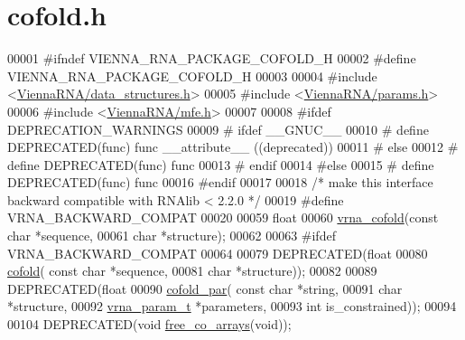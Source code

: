 \hypertarget{cofold_8h_source}{}\section{cofold.\+h}
\label{cofold_8h_source}

\begin{DoxyCode}
00001 \textcolor{preprocessor}{#ifndef VIENNA\_RNA\_PACKAGE\_COFOLD\_H}
00002 \textcolor{preprocessor}{#define VIENNA\_RNA\_PACKAGE\_COFOLD\_H}
00003 
00004 \textcolor{preprocessor}{#include <\hyperlink{data__structures_8h}{ViennaRNA/data\_structures.h}>}
00005 \textcolor{preprocessor}{#include <\hyperlink{params_8h}{ViennaRNA/params.h}>}
00006 \textcolor{preprocessor}{#include <\hyperlink{mfe_8h}{ViennaRNA/mfe.h}>}
00007 
00008 \textcolor{preprocessor}{#ifdef DEPRECATION\_WARNINGS}
00009 \textcolor{preprocessor}{# ifdef \_\_GNUC\_\_}
00010 \textcolor{preprocessor}{#  define DEPRECATED(func) func \_\_attribute\_\_ ((deprecated))}
00011 \textcolor{preprocessor}{# else}
00012 \textcolor{preprocessor}{#  define DEPRECATED(func) func}
00013 \textcolor{preprocessor}{# endif}
00014 \textcolor{preprocessor}{#else}
00015 \textcolor{preprocessor}{# define DEPRECATED(func) func}
00016 \textcolor{preprocessor}{#endif}
00017 
00018 \textcolor{comment}{/* make this interface backward compatible with RNAlib < 2.2.0 */}
00019 \textcolor{preprocessor}{#define VRNA\_BACKWARD\_COMPAT}
00020 
00059 \textcolor{keywordtype}{float}
00060 \hyperlink{group__mfe__cofold_ga9ef3a297201dbf838a8daff2b45c0c82}{vrna\_cofold}(\textcolor{keyword}{const} \textcolor{keywordtype}{char} *sequence,
00061             \textcolor{keywordtype}{char} *structure);
00062 
00063 \textcolor{preprocessor}{#ifdef VRNA\_BACKWARD\_COMPAT}
00064 
00079 DEPRECATED(\textcolor{keywordtype}{float}
00080 \hyperlink{group__mfe__cofold_gabc8517f22cfe70595ee81fc837910d52}{cofold}( \textcolor{keyword}{const} \textcolor{keywordtype}{char} *sequence,
00081         \textcolor{keywordtype}{char} *structure));
00082 
00089 DEPRECATED(\textcolor{keywordtype}{float}
00090 \hyperlink{group__mfe__cofold_ga7612cfeeb1b793f1e4179b1eb53df1f3}{cofold\_par}( \textcolor{keyword}{const} \textcolor{keywordtype}{char} *\textcolor{keywordtype}{string},
00091             \textcolor{keywordtype}{char} *structure,
00092             \hyperlink{group__energy__parameters_structvrna__param__s}{vrna\_param\_t} *parameters,
00093             \textcolor{keywordtype}{int} is\_constrained));
00094 
00104 DEPRECATED(\textcolor{keywordtype}{void} \hyperlink{group__mfe__cofold_gaafb33d7473eb9af9d1b168ca8761c41a}{free\_co\_arrays}(\textcolor{keywordtype}{void}));

\end{DoxyCode}
